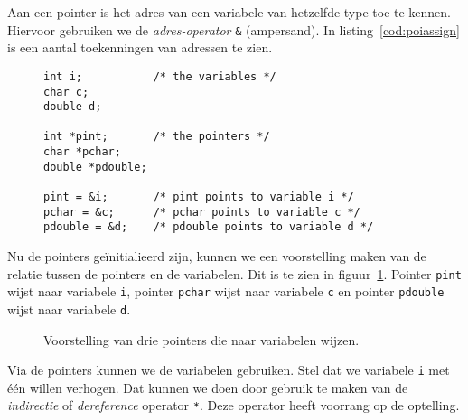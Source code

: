 Aan een pointer is het adres van een variabele van hetzelfde type toe te kennen. Hiervoor gebruiken we de \textsl{adres-operator} \texttt{\&} (ampersand). In listing~\ref{cod:poiassign} is een aantal toekenningen van adressen te zien.

\begin{figure}[H]
\begin{lstlisting}[caption=Enkele toekenningen van adressen aan pointers.,label=cod:poiassign]
int i;           /* the variables */
char c;
double d;

int *pint;       /* the pointers */
char *pchar;
double *pdouble;

pint = &i;       /* pint points to variable i */
pchar = &c;      /* pchar points to variable c */
pdouble = &d;    /* pdouble points to variable d */
\end{lstlisting}
\end{figure}

Nu de pointers geïnitialieerd zijn, kunnen we een voorstelling maken van de relatie tussen de pointers en de variabelen. Dit is te zien in figuur~\ref{fig:poivoorstelling2}. Pointer \texttt{pint} wijst naar variabele \texttt{i}, pointer \texttt{pchar} wijst naar variabele \texttt{c} en pointer \texttt{pdouble} wijst naar variabele \texttt{d}.

\begin{figure}[!ht]
\centering
{}
\caption{Voorstelling van drie pointers die naar variabelen wijzen.}
\label{fig:poivoorstelling2}
\end{figure}

Via de pointers kunnen we de variabelen gebruiken. Stel dat we variabele \texttt{i} met één willen verhogen. Dat kunnen we doen door gebruik te maken van de \textsl{indirectie} of \textsl{dereference} operator \texttt{*}. Deze operator heeft voorrang op de optelling.

